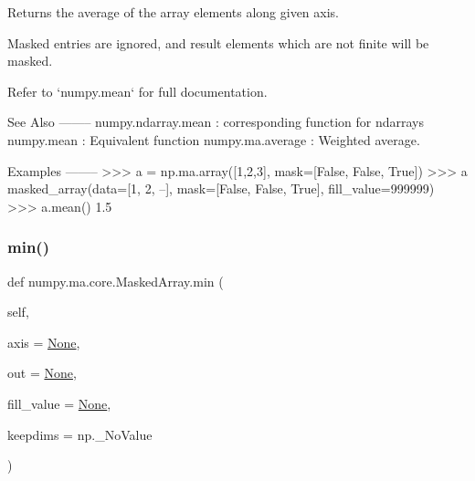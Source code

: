 \begin{DoxyVerb}Returns the average of the array elements along given axis.

Masked entries are ignored, and result elements which are not
finite will be masked.

Refer to `numpy.mean` for full documentation.

See Also
--------
numpy.ndarray.mean : corresponding function for ndarrays
numpy.mean : Equivalent function
numpy.ma.average : Weighted average.

Examples
--------
>>> a = np.ma.array([1,2,3], mask=[False, False, True])
>>> a
masked_array(data=[1, 2, --],
     mask=[False, False,  True],
       fill_value=999999)
>>> a.mean()
1.5\end{DoxyVerb}
 \mbox{\label{classnumpy_1_1ma_1_1core_1_1MaskedArray_ab765cfed3c568b4136399dafdf9db338}} 
\subsubsection{\texorpdfstring{min()}{min()}}
{\footnotesize\ttfamily def numpy.\+ma.\+core.\+Masked\+Array.\+min (\begin{DoxyParamCaption}\item[{}]{self,  }\item[{}]{axis = {\ttfamily \hyperlink{namespacenumpy_1_1ma_1_1core_a647ee1848dfa3692fe35a663a2aa40b3}{None}},  }\item[{}]{out = {\ttfamily \hyperlink{namespacenumpy_1_1ma_1_1core_a647ee1848dfa3692fe35a663a2aa40b3}{None}},  }\item[{}]{fill\+\_\+value = {\ttfamily \hyperlink{namespacenumpy_1_1ma_1_1core_a647ee1848dfa3692fe35a663a2aa40b3}{None}},  }\item[{}]{keepdims = {\ttfamily np.\+\_\+NoValue} }\end{DoxyParamCaption})}

